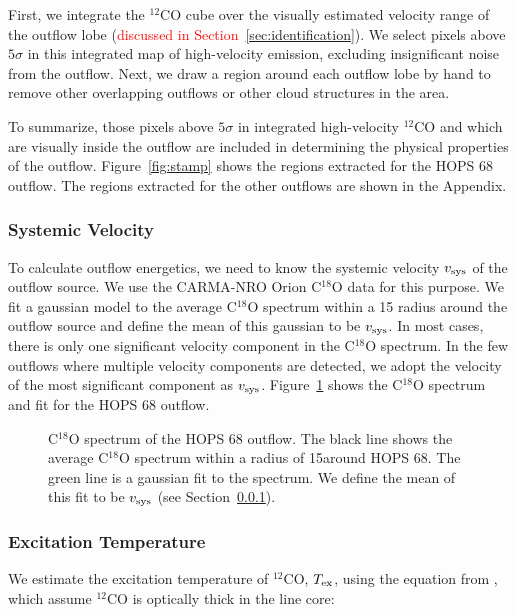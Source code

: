 \documentclass[twocolumn]{aastex63}
\newcommand{\example}{HOPS 68}
\newcommand{\tex}{$T_{\rm ex}$}
\begin{document}
First, we integrate the $^{12}$CO cube over the visually estimated velocity range of the outflow lobe (\textcolor{red}{discussed in Section~\ref{sec:identification}}). We select pixels above $5\sigma$ in this integrated map of high-velocity emission, excluding insignificant noise from the outflow. Next, we draw a region around each outflow lobe by hand to remove other overlapping outflows or other cloud structures in the area. %

To summarize, those pixels above $5\sigma$ in integrated high-velocity $^{12}$CO and which are visually inside the outflow are included in determining the physical properties of the outflow. Figure~\ref{fig:stamp} shows the regions extracted for the \example{} outflow. The regions extracted for the other outflows are shown in the Appendix. 

\subsubsection{Systemic Velocity}\label{sec:vsys}
To calculate outflow energetics, we need to know the systemic velocity $v_{\rm sys}$ of the outflow source. We use the CARMA-NRO Orion C$^{18}$O data \citep{Kong18} for this purpose. We fit a gaussian model to the average C$^{18}$O spectrum within a 15\arcsec{} radius around the outflow source and define the mean of this gaussian to be $v_{\rm sys}$. In most cases, there is only one significant velocity component in the C$^{18}$O spectrum. In the few outflows where multiple velocity components are detected, we adopt the velocity of the most significant component as $v_{\rm sys}$. Figure~\ref{fig:c18o_fit} shows the C$^{18}$O spectrum and fit for the \example{} outflow.

\begin{figure}
\caption{C$^{18}$O spectrum of the \example{} outflow. The black line shows the average C$^{18}$O spectrum within a radius of 15\arcsec around \example{}. The green line is a gaussian fit to the spectrum. We define the mean of this fit to be $v_{\rm sys}$ (see Section~\ref{sec:vsys}). \label{fig:c18o_fit}}
\end{figure}

\subsubsection{Excitation Temperature}\label{sec:tex}
We estimate the excitation temperature of $^{12}$CO, \tex, using the equation from \citet{Rohlfs96}, which assume $^{12}$CO is optically thick in the line core:
\end{document}
